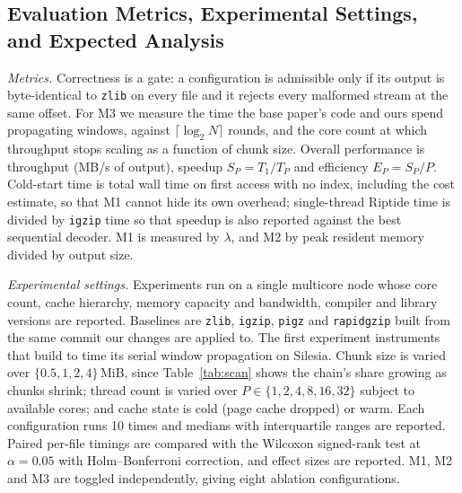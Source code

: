 \documentclass[conference]{IEEEtran}
\begin{document}
\subsection{Evaluation Metrics, Experimental Settings, and Expected Analysis}

\emph{Metrics.} Correctness is a gate: a configuration is admissible only if its
output is byte-identical to \texttt{zlib} on every file and it rejects every
malformed stream at the same offset. For M3 we measure the time the base paper's
code and ours spend propagating windows, against $\lceil \log_2 N \rceil$ rounds,
and the core count at which throughput stops scaling as a function of chunk
size. Overall performance is throughput (MB/s of output), speedup
$S_P = T_1/T_P$ and efficiency $E_P = S_P/P$. Cold-start time is total wall time
on first access with no index, including the cost estimate, so that M1 cannot
hide its own overhead; single-thread Riptide time is divided by \texttt{igzip}
time so that speedup is also reported against the best sequential decoder. M1 is
measured by $\lambda$, and M2 by peak resident memory divided by output size.

\emph{Experimental settings.} Experiments run on a single multicore node whose
core count, cache hierarchy, memory capacity and bandwidth, compiler and library
versions are reported. Baselines are \texttt{zlib}, \texttt{igzip}, \texttt{pigz}
and \texttt{rapidgzip} built from the same commit our changes are applied to.
The first experiment instruments that build to time its serial window
propagation on Silesia. Chunk size is varied over $\{0.5, 1, 2, 4\}$\,MiB, since
Table~\ref{tab:scan} shows the chain's share growing as chunks shrink; thread
count is varied over $P \in \{1, 2, 4, 8, 16, 32\}$ subject to available cores;
and cache state is cold (page cache dropped) or warm. Each configuration runs 10
times and medians with interquartile ranges are reported. Paired per-file timings
are compared with the Wilcoxon signed-rank test at $\alpha = 0.05$ with
Holm--Bonferroni correction, and effect sizes are reported. M1, M2 and M3 are
toggled independently, giving eight ablation configurations.
\end{document}
